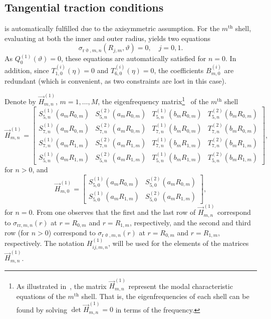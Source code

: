 \subsection{Tangential traction conditions}
 is automatically fulfilled due to the axisymmetric assumption. For the $m^{\mathrm{th}}$ shell, evaluating  at both the inner and outer radius, yields two equations 
\begin{equation}\label{Eq1:tractionCondInserted}
	\sigma_{\mathrm{r}\upvartheta,m,n}(R_{j,m},\vartheta) = 0, \quad j=0,1.
\end{equation}
As $Q_0^{(1)}(\vartheta)=0$, these equations are automatically satisfied for $n=0$. In addition, since $T_{1,0}^{(i)}(\eta)=0$ and $T_{6,0}^{(i)}(\eta)=0$, the coefficients $B_{m,0}^{(i)}$ are redundant (which is convenient, as two constraints are lost in this case). 

Denote by $\vec{H}_{m,n}^{(1)}$, $m=1,\dots,M$, the eigenfrequency matrix\footnote{As illustrated in~\cite{Chang1994voa}, the matrix $\vec{H}_{m,n}^{(1)}$ represent the modal characteristic equations of the $m^{\mathrm{th}}$ shell. That is, the eigenfrequencies of each shell can be found by solving $\det\vec{H}_{m,n}^{(1)}=0$ in terms of the frequency.}~\cite[p. 17]{Chang1994voa} of the $m^{\mathrm{th}}$ shell
\begin{equation}\label{Eq1:K1n}
	\vec{H}_{m,n}^{(1)} = \begin{bmatrix} S_{5,n}^{(1)}(a_m R_{0,m}) & S_{5,n}^{(2)}(a_m R_{0,m}) & T_{5,n}^{(1)}(b_m R_{0,m}) & T_{5,n}^{(2)}(b_m R_{0,m})\\
	S_{7,n}^{(1)}(a_m R_{0,m}) & S_{7,n}^{(2)}(a_m R_{0,m}) & T_{7,n}^{(1)}(b_m R_{0,m}) & T_{7,n}^{(2)}(b_m R_{0,m})\\
	S_{7,n}^{(1)}(a_m R_{1,m}) & S_{7,n}^{(2)}(a_m R_{1,m}) & T_{7,n}^{(1)}(b_m R_{1,m}) & T_{7,n}^{(2)}(b_m R_{1,m})\\
	S_{5,n}^{(1)}(a_m R_{1,m}) & S_{5,n}^{(2)}(a_m R_{1,m}) & T_{5,n}^{(1)}(b_m R_{1,m}) & T_{5,n}^{(2)}(b_m R_{1,m})\end{bmatrix},
\end{equation}
for $n>0$, and 
\begin{equation}\label{Eq1:K10}
	\vec{H}_{m,0}^{(1)} = \begin{bmatrix}	
	 S_{5,0}^{(1)}(a_m R_{0,m}) & S_{5,0}^{(2)}(a_m R_{0,m})\\
	 S_{5,0}^{(1)}(a_m R_{1,m}) & S_{5,0}^{(2)}(a_m R_{1,m})\end{bmatrix},
\end{equation}
for $n=0$. From  one observes that the first and the last row of $\vec{H}_{m,n}^{(1)}$ correspond to $\sigma_{\mathrm{rr},m,n}(r)$ at $r=R_{0,m}$ and $r=R_{1,m}$, respectively, and the second and third row (for $n>0$) correspond to $\sigma_{\mathrm{r}\upvartheta,m,n}(r)$ at $r=R_{0,m}$ and $r=R_{1,m}$, respectively. The notation $H_{ij,m,n}^{(1)}$, will be used for the elements of the matrices $\vec{H}_{m,n}^{(1)}$.

